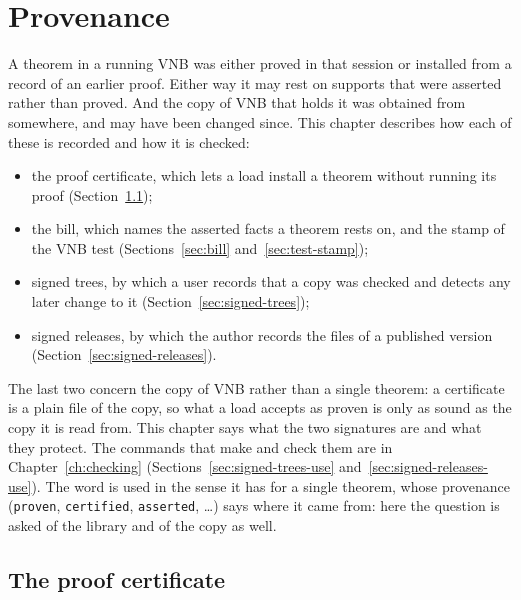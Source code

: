 \chapter{Provenance}
\label{ch:provenance}

A theorem in a running VNB was either proved in that session or
installed from a record of an earlier proof.  Either way it may rest on
supports that were asserted rather than proved.  And the copy of VNB
that holds it was obtained from somewhere, and may have been changed
since.  This chapter describes how each of these is recorded and how it
is checked:
\begin{itemize}
\item the proof certificate, which lets a load install a theorem without
  running its proof (Section~\ref{sec:proof-certificate});
\item the bill, which names the asserted facts a theorem rests on, and
  the stamp of the VNB test (Sections~\ref{sec:bill}
  and~\ref{sec:test-stamp});
\item signed trees, by which a user records that a copy was checked and
  detects any later change to it (Section~\ref{sec:signed-trees});
\item signed releases, by which the author records the files of a
  published version (Section~\ref{sec:signed-releases}).
\end{itemize}
The last two concern the copy of VNB rather than a single theorem: a
certificate is a plain file of the copy, so what a load accepts as
proven is only as sound as the copy it is read from.  This chapter says
what the two signatures are and what they protect.  The commands that
make and check them are in Chapter~\ref{ch:checking}
(Sections~\ref{sec:signed-trees-use} and~\ref{sec:signed-releases-use}).
The word is used in the sense it has for a single theorem, whose
provenance (\texttt{proven}, \texttt{certified}, \texttt{asserted},
\ldots) says where it came from: here the question is asked of the
library and of the copy as well.

\section{The proof certificate}\label{sec:proof-certificate}

